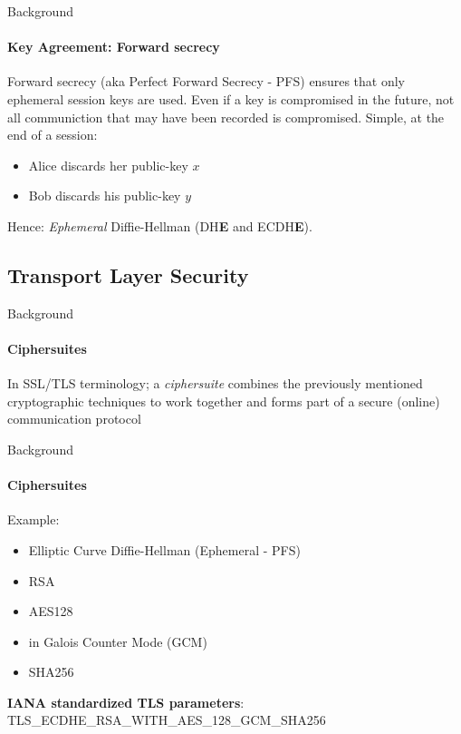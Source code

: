 \documentclass[hyperref={draft}]{beamer}
\begin{document}
\begin{frame}{Background}
  \framesubtitle{Key Agreement: Forward secrecy}
  Forward secrecy (aka Perfect Forward Secrecy - PFS) ensures that only ephemeral session keys are used.
  \newline
  \newline
  Even if a key is compromised in the future, not all communiction that may have been recorded is compromised.
  \newline
  \newline
  Simple, at the end of a session:
  \begin{itemize}
    \item Alice discards her public-key $x$
    \item Bob discards his public-key $y$
  \end{itemize}
  Hence: \emph{Ephemeral} Diffie-Hellman (DH\textbf{E} and ECDH\textbf{E}).
\end{frame}

\subsection{Transport Layer Security}

\begin{frame}{Background}
  \framesubtitle{Ciphersuites}
  In SSL/TLS terminology; a \emph{ciphersuite} combines the previously mentioned cryptographic techniques to work together and forms part of a secure (online) communication protocol
\end{frame}

\begin{frame}{Background}
  \framesubtitle{Ciphersuites}
  Example:
  \begin{itemize}
    \item Elliptic Curve Diffie-Hellman (Ephemeral - PFS)
    \item RSA
    \item AES128
    \item in Galois Counter Mode (GCM)
    \item SHA256
  \end{itemize}
  \textbf{IANA standardized TLS parameters}:\\
  TLS\_ECDHE\_RSA\_WITH\_AES\_128\_GCM\_SHA256 
\end{frame}
\end{document}
